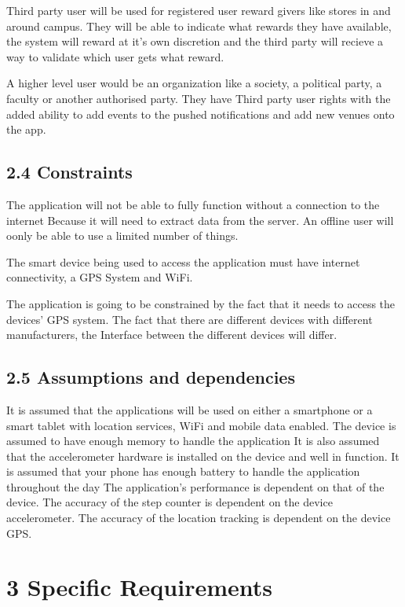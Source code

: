 \documentclass[11pt]{article}
\begin{document}
		Third party user will be used for registered user reward givers like stores in and around campus. They will be able to 			indicate what rewards they have available, the system will reward at it’s own discretion and the third party will 			recieve a way to validate which user gets what reward.
		
		A higher level user would be an organization like a society, a political party, a faculty or another authorised party. 
		They have Third party user rights with the added ability to add events to the pushed notifications and add new venues 			onto the app.

		\subsection{2.4 Constraints}
		The application will not be able to fully function without a connection to the internet Because it will need to extract 		data from the server. An offline user will oonly be able to use a limited number of things.

		The smart device being used to access the application must have internet connectivity, a GPS 
		System and WiFi.

		The application is going to be constrained by the fact that it needs to access the devices’ 
		GPS system. The fact that there are different devices with different manufacturers, the Interface between the different 		devices will differ.

		\subsection{2.5 Assumptions and dependencies}
		It is assumed that the applications will be used on either a smartphone or a smart tablet with location services, WiFi 			and mobile data enabled.
		The device is assumed to have enough memory to handle the application
		It is also assumed that the accelerometer hardware is installed on the device and well in function.
		It is assumed that your phone has enough battery to handle the application throughout the day
		The application’s performance is dependent on that of the device.
		The accuracy of the step counter is dependent on the device accelerometer.
		The accuracy of the location tracking is dependent on the device GPS.
		
		\section{3 Specific Requirements}
		
\end{document}
